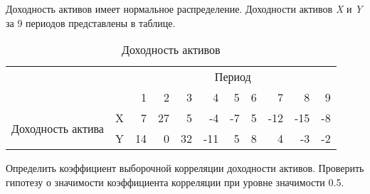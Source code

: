 \documentclass[12pt,a4paper]{article}
\begin{document}
\begin{taskrus} 
\label{task_sign_corrXY}
Доходность активов имеет нормальное распределение. Доходности активов \textit{X} и \textit{Y} за 9 периодов представлены в таблице.
\begin{table}[H]
  \centering
  \caption{Доходность активов}
    \begin{tabular}{rrrrrrrrrrr}
    \toprule
    \multicolumn{2}{c}{\multirow{2}[1]{*}{}} & \multicolumn{9}{c}{Период} \\\cmidrule{3-11}
    \multicolumn{2}{c}{} & 1     & 2     & 3     & 4     & 5     & 6     & 7     & 8     & 9 \\
    \midrule
    \multicolumn{1}{l}{\multirow{2}[1]{*}{Доходность актива}} & X     & 7     & 27    & 5     & -4    & -7    & 5     & -12   & -15   & -8 \\
    \multicolumn{1}{l}{} & Y     & 14    & 0     & 32    & -11   & 5     & 8     & 4     & -3    & -2 \\
    \bottomrule
    \end{tabular}%
  \label{tab:addlabel}%
\end{table}%
Определить коэффициент выборочной корреляции доходности активов. Проверить гипотезу о значимости коэффициента корреляции при уровне значимости 0.5.
\end{taskrus}
\end{document}
